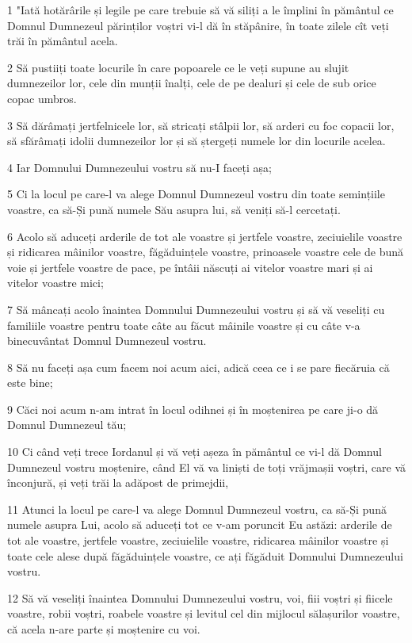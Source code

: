 \par 1 "Iată hotărârile și legile pe care trebuie să vă siliți a le împlini în pământul ce Domnul Dumnezeul părinților voștri vi-l dă în stăpânire, în toate zilele cît veți trăi în pământul acela.
\par 2 Să pustiiți toate locurile în care popoarele ce le veți supune au slujit dumnezeilor lor, cele din munții înalți, cele de pe dealuri și cele de sub orice copac umbros.
\par 3 Să dărâmați jertfelnicele lor, să stricați stâlpii lor, să arderi cu foc copacii lor, să sfărâmați idolii dumnezeilor lor și să ștergeți numele lor din locurile acelea.
\par 4 Iar Domnului Dumnezeului vostru să nu-I faceți așa;
\par 5 Ci la locul pe care-l va alege Domnul Dumnezeul vostru din toate semințiile voastre, ca să-Și pună numele Său asupra lui, să veniți să-l cercetați.
\par 6 Acolo să aduceți arderile de tot ale voastre și jertfele voastre, zeciuielile voastre și ridicarea mâinilor voastre, făgăduințele voastre, prinoasele voastre cele de bună voie și jertfele voastre de pace, pe întâii născuți ai vitelor voastre mari și ai vitelor voastre mici;
\par 7 Să mâncați acolo înaintea Domnului Dumnezeului vostru și să vă veseliți cu familiile voastre pentru toate câte au făcut mâinile voastre și cu câte v-a binecuvântat Domnul Dumnezeul vostru.
\par 8 Să nu faceți așa cum facem noi acum aici, adică ceea ce i se pare fiecăruia că este bine;
\par 9 Căci noi acum n-am intrat în locul odihnei și în moștenirea pe care ji-o dă Domnul Dumnezeul tău;
\par 10 Ci când veți trece Iordanul și vă veți așeza în pământul ce vi-l dă Domnul Dumnezeul vostru moștenire, când El vă va liniști de toți vrăjmașii voștri, care vă înconjură, și veți trăi la adăpost de primejdii,
\par 11 Atunci la locul pe care-l va alege Domnul Dumnezeul vostru, ca să-Și pună numele asupra Lui, acolo să aduceți tot ce v-am poruncit Eu astăzi: arderile de tot ale voastre, jertfele voastre, zeciuielile voastre, ridicarea mâinilor voastre și toate cele alese după făgăduințele voastre, ce ați făgăduit Domnului Dumnezeului vostru.
\par 12 Să vă veseliți înaintea Domnului Dumnezeului vostru, voi, fiii voștri și fiicele voastre, robii voștri, roabele voastre și levitul cel din mijlocul sălașurilor voastre, că acela n-are parte și moștenire cu voi.

